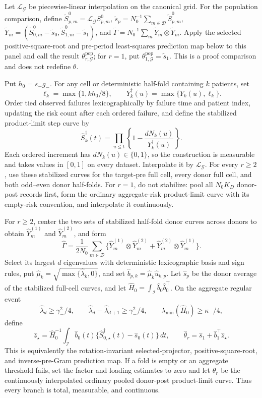 Let \(\mathcal L_{\mathcal G}\) be piecewise-linear interpolation on the canonical grid. For the population comparison, define \(\widetilde S^0_{p,m}=\mathcal L_{\mathcal G}S^0_{p,m}\), \(\widetilde s_p=N_0^{-1}\sum_{m\in\mathcal D}\widetilde S^0_{p,m}\), \(\widetilde Y_m=(\widetilde S^0_{0,m}-\widetilde s_0,\widetilde S^0_{1,m}-\widetilde s_1)\), and \(\widetilde\Gamma=N_0^{-1}\sum_m\widetilde Y_m\otimes\widetilde Y_m\). Apply the selected positive-square-root and pre-period least-squares prediction map below to this panel and call the result \(\theta^{\mathrm{pop}}_{r,\mathcal G}\); for \(r=1\), put \(\theta^{\mathrm{pop}}_{1,\mathcal G}=\widetilde s_1\). This is a proof comparison and does not redefine \(\theta\).

Put \(h_0=s_-g_-\). For any cell or deterministic half-fold containing \(k\) patients, set
\[
 \ell_k=\max\{1,kh_0/8\},\qquad
 Y_k^\dagger(u)=\max\{Y_k(u),\ell_k\}.
\]
Order tied observed failures lexicographically by failure time and patient index, updating the risk count after each ordered failure, and define the stabilized product-limit step curve by
\[
 \widehat S_k^\dagger(t)=
 \prod_{u\le t}\left\{1-\frac{dN_k(u)}{Y_k^\dagger(u)}\right\}.
\]
Each ordered increment has \(dN_k(u)\in\{0,1\}\), so the construction is measurable and takes values in \([0,1]\) on every dataset. Interpolate it by \(\mathcal L_{\mathcal G}\). For every \(r\ge2\), use these stabilized curves for the target-pre full cell, every donor full cell, and both odd--even donor half-folds. For \(r=1\), do not stabilize: pool all \(N_0K_D\) donor-post records first, form the ordinary aggregate-risk product-limit curve with its empty-risk convention, and interpolate it continuously.

For \(r\ge2\), center the two sets of stabilized half-fold donor curves across donors to obtain \(\widehat Y_m^{(1)}\) and \(\widehat Y_m^{(2)}\), and form
\[
 \widehat\Gamma=\frac{1}{2N_0}\sum_{m\in\mathcal D}
 \{\widehat Y_m^{(1)}\otimes\widehat Y_m^{(2)}+
   \widehat Y_m^{(2)}\otimes\widehat Y_m^{(1)}\}.
\]
Select its largest \(d\) eigenvalues with deterministic lexicographic basis and sign rules, put \(\widehat\mu_k=\sqrt{\max\{\widehat\lambda_k,0\}}\), and set \(\widehat b_{p,k}=\widehat\mu_k\widehat u_{k,p}\). Let \(\widehat s_p\) be the donor average of the stabilized full-cell curves, and let \(\widehat H_0=\int_{\mathcal I}\widehat b_0\widehat b_0^\top\). On the aggregate regular event
\[
 \widehat\lambda_d\ge\gamma_-^2/4,\qquad
 \widehat\lambda_d-\widehat\lambda_{d+1}\ge\gamma_-^2/4,
 \qquad \lambda_{\min}(\widehat H_0)\ge\kappa_-/4,
\]
define
\[
 \widehat z_\star=\widehat H_0^{-1}\int_{\mathcal I}\widehat b_0(t)
 \{\widehat S_{0,\star}^\dagger(t)-\widehat s_0(t)\}\,dt,
 \qquad
 \widehat\theta_r=\widehat s_1+\widehat b_1^\top\widehat z_\star.
\]
This is equivalently the rotation-invariant selected-projector, positive-square-root, and inverse-pre-Gram prediction map. If a fold is empty or an aggregate threshold fails, set the factor and loading estimates to zero and let \(\widehat\theta_r\) be the continuously interpolated ordinary pooled donor-post product-limit curve. Thus every branch is total, measurable, and continuous.

